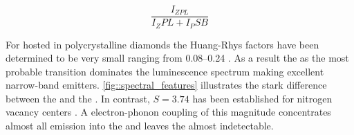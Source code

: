    \begin{equation}
     \frac{I_{ZPL}}{I_ZPL + I_PSB}
   \end{equation}

   For \sivs hosted in polycrystalline diamonds the Huang-Rhys factors have been determined to be very small ranging from \SIrange{0.08}{0.24}{} \cite{neu::39,neu::40,neu::41}. As a result the \zpl as the most probable transition dominates the luminescence spectrum making \sivs excellent narrow-band emitters. \autoref{fig::spectral_features} illustrates the stark difference between the \zpl and the \psb. In contrast, $S=3.74$ has been established for nitrogen vacancy centers \cite{neu::94}. A electron-phonon coupling of this magnitude concentrates almost all emission into the \psb and leaves the \zpl almost indetectable.

   \begin{figure}[thbp]
 		\begin{subfigure}[t]{ 0.49\linewidth}
 			\centering
 			\caption{}
 		\end{subfigure}
 		\hfill
 		\begin{subfigure}[t]{ 0.49\linewidth}
 			\centering

\end{subfigure}
\end{figure}
